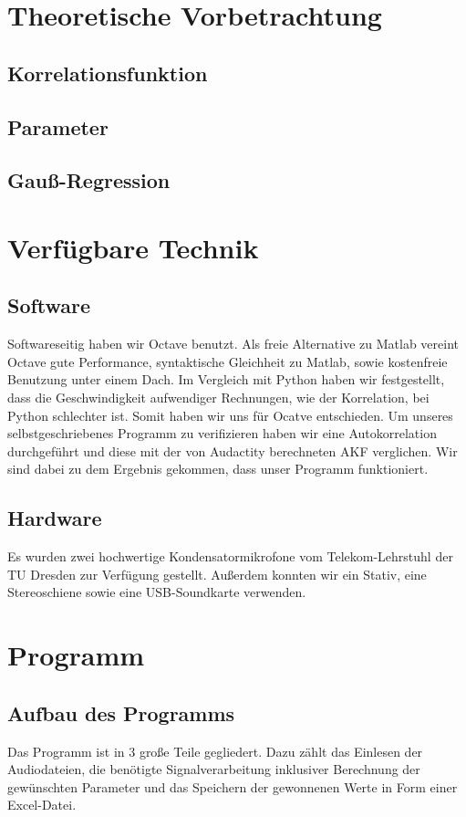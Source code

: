 \documentclass[a4paper, 11pt]{article}
\begin{document}
\section{Theoretische Vorbetrachtung}
\subsection{Korrelationsfunktion}
\subsection{Parameter}
\subsection{Gauß-Regression}

\section{Verfügbare Technik}
\subsection{Software}
Softwareseitig haben wir Octave benutzt. Als freie Alternative zu Matlab vereint Octave gute Performance, syntaktische Gleichheit zu Matlab, sowie kostenfreie Benutzung unter einem Dach. Im Vergleich mit Python haben wir festgestellt, dass die Geschwindigkeit aufwendiger Rechnungen, wie der Korrelation, bei Python schlechter ist. Somit haben wir uns für Ocatve entschieden. Um unseres selbstgeschriebenes Programm zu verifizieren haben wir eine Autokorrelation durchgeführt und diese mit der von Audactity berechneten AKF verglichen. Wir sind dabei zu dem Ergebnis gekommen, dass unser Programm funktioniert.
\subsection{Hardware}
Es wurden zwei hochwertige Kondensatormikrofone vom Telekom-Lehrstuhl der TU Dresden zur Verfügung gestellt. Außerdem konnten wir ein Stativ, eine Stereoschiene sowie eine USB-Soundkarte verwenden.
\section{Programm}
\subsection{Aufbau des Programms}
Das Programm ist in 3 große Teile gegliedert. Dazu zählt das Einlesen der Audiodateien, die benötigte Signalverarbeitung inklusiver Berechnung der gewünschten Parameter und das Speichern der gewonnenen Werte in Form einer Excel-Datei.
\end{document}
